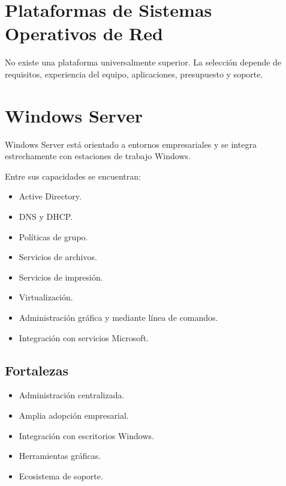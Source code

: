 \documentclass[
  spanish,
  letterpaper,
]{scrbook}
\providecommand{\tightlist}{%
  \setlength{\itemsep}{0pt}\setlength{\parskip}{0pt}}
\begin{document}

\chapter{Plataformas de Sistemas Operativos de
Red}\label{plataformas-de-sistemas-operativos-de-red}

No existe una plataforma universalmente superior. La selección depende
de requisitos, experiencia del equipo, aplicaciones, presupuesto y
soporte.


\chapter{Windows Server}\label{windows-server}

Windows Server está orientado a entornos empresariales y se integra
estrechamente con estaciones de trabajo Windows.

Entre sus capacidades se encuentran:

\begin{itemize}
\tightlist
\item
  Active Directory.
\item
  DNS y DHCP.
\item
  Políticas de grupo.
\item
  Servicios de archivos.
\item
  Servicios de impresión.
\item
  Virtualización.
\item
  Administración gráfica y mediante línea de comandos.
\item
  Integración con servicios Microsoft.
\end{itemize}

\section{Fortalezas}\label{fortalezas}

\begin{itemize}
\tightlist
\item
  Administración centralizada.
\item
  Amplia adopción empresarial.
\item
  Integración con escritorios Windows.
\item
  Herramientas gráficas.
\item
  Ecosistema de soporte.
\end{itemize}
\end{document}
